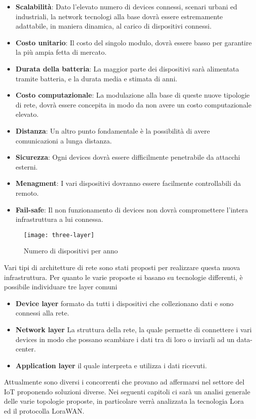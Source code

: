 \begin{itemize}
\item \textbf{Scalabilità}: Dato l'elevato numero di devices connessi, scenari
urbani ed industriali, la network tecnologi alla base dovrà essere estremamente
adattabile, in maniera dinamica, al carico di dispositivi connessi.
\item \textbf{Costo unitario}: Il costo del singolo modulo, dovrà essere basso
per garantire la più ampia fetta di mercato.
\item \textbf{Durata della batteria}: La maggior parte dei dispositivi sarà
alimentata tramite batteria, e la durata media e stimata di anni. 
\item \textbf{Costo computazionale}: La modulazione alla base di queste nuove
tipologie di rete, dovrà essere concepita in modo da non avere un costo
computazionale elevato.
\item \textbf{Distanza}: Un altro punto fondamentale è la possibilità di avere
comunicazioni a lunga distanza.
\item \textbf{Sicurezza}: Ogni devices dovrà essere difficilmente penetrabile da
attacchi esterni.
\item \textbf{Menagment}: I vari dispositivi dovranno essere facilmente
controllabili da remoto.
\item \textbf{Fail-safe}: Il non funzionamento di devices non dovrà
compromettere l'intera infrastruttura a lui connessa. 
\end{itemize}

\begin{figure}[h]
\centering 
\texttt{[image: three-layer]}
\caption{Numero di dispositivi per anno}
\end{figure}

Vari tipi di architetture di rete sono stati proposti per realizzare questa
nuova infrastruttura. Per quanto le varie proposte si basano su tecnologie
differenti, è possibile individuare tre layer comuni 
\begin{itemize}
\item \textbf{Device layer} formato da tutti i dispositivi che collezionano dati
e sono connessi alla rete.
\item \textbf{Network layer} La struttura della rete, la quale permette di
connettere i vari devices in modo che possano scambiare i dati tra di loro o
inviarli ad un data-center.
\item \textbf{Application layer} il quale interpreta e utilizza i dati ricevuti.
\end{itemize}

Attualmente sono diversi i concorrenti che provano ad affermarsi nel settore
del IoT proponendo soluzioni diverse. Nei seguenti capitoli ci sarà un analisi
generale delle varie topologie proposte, in particolare verrà analizzata la
tecnologia Lora ed il protocolla LoraWAN.

